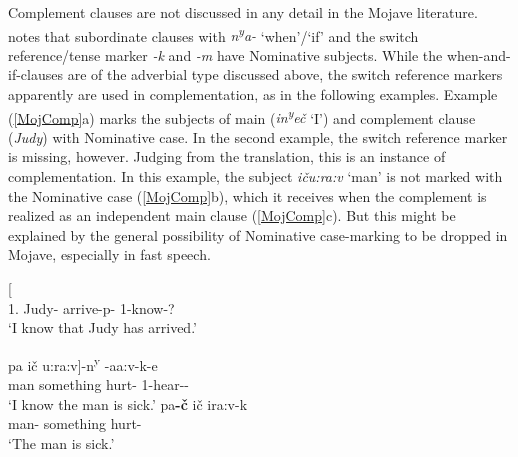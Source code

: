 Complement clauses are not discussed in any detail in the Mojave literature.  
\citet[232--234]{Munro:1976} notes that subordinate clauses with \emph{n\textsuperscript{y}a-} `when'/`if' and the switch reference/tense marker \emph{-k} and \emph{-m} have Nominative  subjects. 
While the when-and-if-clauses are of the adverbial type discussed above, the switch reference markers apparently are used in complementation, as in the following examples. 
Example (\ref{MojComp}a) marks the subjects of main (\emph{in\textsuperscript{y}e\v c} `I') and complement clause (\emph{Judy}) with Nominative  case.
In the second example, the switch reference marker is missing, however. 
Judging from the translation, this is an instance of complementation. 
In this example, the subject \emph{i\v cu:ra:v} `man' is not marked with the Nominative  case (\ref{MojComp}b), which it receives when the complement is realized as an independent main clause (\ref{MojComp}c). 
But this might be explained by the general possibility of Nominative case-marking to be
dropped in Mojave, especially in fast speech.%
\enlargethispage{\baselineskip}

\begin{exe}\ex\label{MojComp}
\begin{xlist}
\ex\gll{}  {\rm[} \textipa{iva:-p-m}{\rm]} \\
1\sg{}.\nom{} \hspaceThis{[}Judy-\nom{} arrive-p-\dsbj{} 1-know-?\\
\glt `I know that Judy has arrived.'

\ex\gll  {\rm[}pa \textglotstop i\v c u:ra:v{\rm]}-n\textsuperscript{y} \textglotstop-a\textglotstop a:v-k-e\\
\hspaceThis{[}man something hurt-\dem{} 1-hear-\tns{}-\augv{}\\
\glt `I know the man is sick.'
\ex\gll pa\textbf{-\v c} \textglotstop i\v c ira:v-k\\
man-\nom{} something hurt-\tns{}\\
\glt `The man is sick.'
\end{xlist} 
\end{exe}

